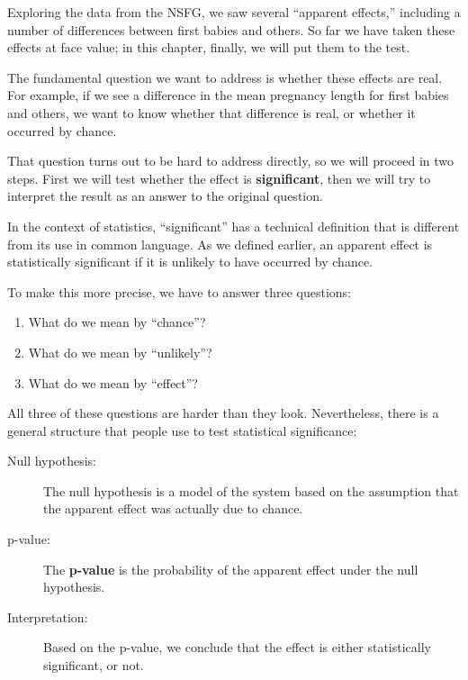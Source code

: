 \documentclass[12pt]{book}
\begin{document}
Exploring the data from the NSFG, we saw several ``apparent effects,''
including a number of differences between first babies and others.
So far we have taken these effects at face value; in this chapter,
finally, we will put them to the test.

The fundamental question we want to address is whether these effects
are real.  For example, if we see a difference in the mean pregnancy
length for first babies and others, we want to know whether that
difference is real, or whether it occurred by chance.

That question turns out to be hard to address directly, so we will
proceed in two steps.  First we will test whether the effect is {\bf
  significant}, then we will try to interpret the result
  as an answer to the original question.

In the context of statistics, ``significant'' has a technical
definition that is different from its use in common language.
As we defined earlier, an apparent effect is statistically
significant if it is unlikely to have occurred by chance.

To make this more precise, we have to answer three questions:

\begin{enumerate}

\item What do we mean by ``chance''?

\item What do we mean by ``unlikely''?

\item What do we mean by ``effect''?

\end{enumerate}

All three of these questions are harder than they look.  Nevertheless,
there is a general structure that people use to test statistical
significance:

\begin{description}

\item[Null hypothesis:] The null hypothesis is a model of the system
  based on the assumption that the apparent effect was actually due to
  chance.

\item[p-value:] The {\bf p-value} is the probability of the apparent
  effect under the null hypothesis.

\item[Interpretation:] Based on the p-value, we conclude that the
  effect is either statistically significant, or not.

\end{description}
\end{document}
